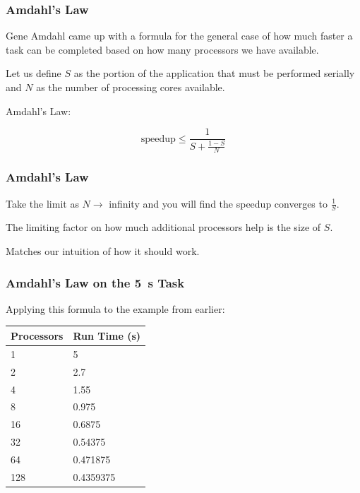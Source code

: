 \begin{frame}
	\frametitle{Amdahl's Law}

	Gene Amdahl came up with a formula for the general case of how much faster a task can be completed based on how many processors we have available.

	Let us define $S$ as the portion of the application that must be performed serially and $N$ as the number of processing cores available.

	Amdahl's Law:

	\begin{center}
		\[
			\text{speedup} \leq \frac{1}{S + \frac{1-S}{N}}
		\]
	\end{center}

\end{frame}


\begin{frame}
	\frametitle{Amdahl's Law}

	Take the limit as $N \rightarrow$ infinity and you will find the speedup converges to $\frac{1}{S}$.


	The limiting factor on how much additional processors help is the size of $S$.

	Matches our intuition of how it should work.

\end{frame}


\begin{frame}
	\frametitle{Amdahl's Law on the 5~s Task}

	Applying this formula to the example from earlier:

	\begin{center}
		\begin{tabular}{l|l}
			\textbf{Processors} & \textbf{Run Time (s)} \\ \hline
			1                   & 5                     \\
			2                   & 2.7                   \\
			4                   & 1.55                  \\
			8                   & 0.975                 \\
			16                  & 0.6875                \\
			32                  & 0.54375               \\
			64                  & 0.471875              \\
			128                 & 0.4359375             \\
		\end{tabular}
	\end{center}

\end{frame}


